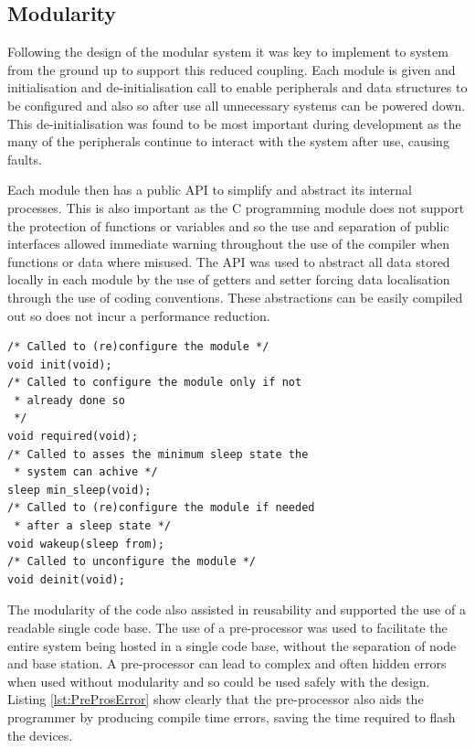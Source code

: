 \subsection{Modularity}
Following the design of the modular system it was key to implement to system from the ground up
to support this reduced coupling. Each module is given and initialisation and de-initialisation call to
enable peripherals and data structures to be configured and also so after use all unnecessary
systems can be powered down. This de-initialisation was found to be most important during
development as the many of the peripherals continue to interact with the system after use, causing
faults.

Each module then has a public \ac{API} to simplify and abstract its internal processes. This is also
important as the C programming module does not support the protection of functions or variables
and so the use and separation of public interfaces allowed immediate warning throughout the use of
the compiler when functions or data where misused. The \ac{API} was used to abstract all data stored
locally in each module by the use of getters and setter forcing data localisation through the use of
coding conventions. These abstractions can be easily compiled out so does not incur a performance
reduction.

\clearpage
\clearpage
{}
\begin{lstlisting}
/* Called to (re)configure the module */
void init(void);
/* Called to configure the module only if not
 * already done so
 */
void required(void);
/* Called to asses the minimum sleep state the
 * system can achive */
sleep min_sleep(void);
/* Called to (re)configure the module if needed
 * after a sleep state */
void wakeup(sleep from);
/* Called to unconfigure the module */
void deinit(void);
\end{lstlisting}

The modularity of the code also assisted in reusability and supported the use of a
readable single code base. The use of a pre-processor was used to facilitate the
entire system being hosted in a single code base, without the separation of node
and base station. A pre-processor can lead to complex and often hidden errors when
used without modularity and so could be used safely with the design.
Listing \ref{lst:PreProsError} show clearly that the pre-processor also aids the
programmer by producing compile time errors, saving the time required to flash the devices.

